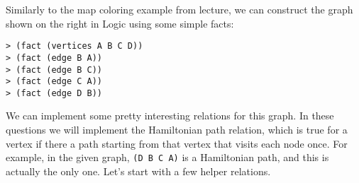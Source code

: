 
Similarly to the map coloring example from lecture, we can construct the graph
shown on the right in Logic using some simple facts:\\

\begin{lstlisting}
> (fact (vertices A B C D))
> (fact (edge B A))
> (fact (edge B C))
> (fact (edge C A))
> (fact (edge D B))
\end{lstlisting}

\vspace{-3cm}
\hspace{9cm}

We can implement some pretty interesting relations for this graph. In these
questions we will implement the Hamiltonian path relation, which is true for a
vertex if there a path starting from that vertex that visits each node once. For
example, in the given graph, {\tt (D B C A)} is a Hamiltonian path, and this is
actually the only one. Let's start with a few helper relations.

\vspace{1cm}

